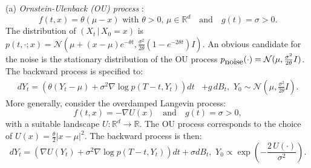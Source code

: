 \documentclass[letterpaper,11pt,reqno]{amsart}
\numberwithin{equation}{section}
\begin{document}
\medskip
\noindent
(a) 
{\em Ornstein-Ulenback (OU) process} \cite{DV21}:
\begin{equation}
\label{eq:OUfg}
f(t,x) = \theta (\mu - x)  \mbox{ with } \theta > 0, \, \mu \in \mathbb{R}^d
\quad \mbox{and} \quad
g(t) = \sigma > 0.
\end{equation}
The distribution of $(X_t \,|\, X_0 = x)$ is 
$p(t, \cdot; x) = \mathcal{N}(\mu + (x - \mu) e^{-\theta t}, \frac{\sigma^2}{2\theta} (1 - e^{-2 \theta t}) I)$.
An obvious candidate for the noise is
the stationary distribution of the OU process
$p_{\tiny \mbox{noise}}(\cdot) =  \mathcal{N}(\mu, \frac{\sigma^2}{2 \theta} I)$.
The backward process is specified to:
\begin{equation}
\label{eq:OUrev2}
\begin{aligned}
d Y_t = \left(\theta(Y_t - \mu) + \sigma^2 \nabla \log p(T-t, Y_t) \right) dt & +g \, dB_t, 
\,\, Y_0 \sim \mathcal{N}\left(\mu, \frac{\sigma^2}{2 \theta} I\right).
\end{aligned}
\end{equation}
More generally, consider the overdamped Langevin process:
\begin{equation}
f(t,x) = - \nabla U(x) \quad \mbox{and} \quad g(t) = \sigma > 0,
\end{equation}
with a suitable landscape $U: \mathbb{R}^d \to \mathbb{R}$.
The OU process corresponds to the choice of $U(x) = \frac{\theta}{2}|x - \mu|^2$.
The backward process is then:
\begin{equation}
\label{eq:OUrev}
d Y_t = \left(\nabla U(Y_t)+ \sigma^2 \nabla \log p(T-t, Y_t) \right) dt  + \sigma dB_t, 
\,\, Y_0 \propto \exp\left(- \frac{2 \, U(\cdot)}{\sigma^2}\right).
\end{equation}
\end{document}
